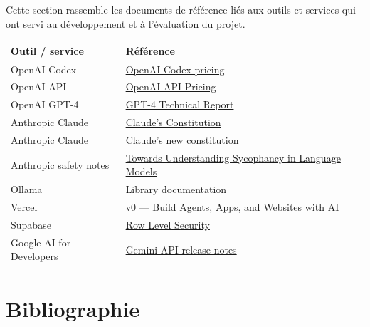 \documentclass[
  10pt,
  a4paper,
  DIV=11,
  numbers=noendperiod,
  oneside]{scrreprt}
\newcounter{none} %
\begin{document}
Cette section rassemble les documents de référence liés aux outils et
services qui ont servi au développement et à l'évaluation du projet.

{\def\LTcaptype{none} %
\begin{longtable}[]{@{}
  >{\raggedright\arraybackslash}p{}
  >{\raggedright\arraybackslash}p{}@{}}
\toprule\noalign{}
\begin{minipage}[b]{\linewidth}\raggedright
Outil / service
\end{minipage} & \begin{minipage}[b]{\linewidth}\raggedright
Référence
\end{minipage} \\
\midrule\noalign{}
\endhead
\bottomrule\noalign{}
\endlastfoot
OpenAI Codex & \href{https://developers.openai.com/codex/pricing}{OpenAI
Codex pricing} \\
OpenAI API & \href{https://openai.com/api/pricing/}{OpenAI API
Pricing} \\
OpenAI GPT-4 & \href{https://openai.com/research/gpt-4}{GPT-4 Technical
Report} \\
Anthropic Claude &
\href{https://www.anthropic.com/news/claudes-constitution}{Claude's
Constitution} \\
Anthropic Claude &
\href{https://www.anthropic.com/news/claudes-new-constitution}{Claude's
new constitution} \\
Anthropic safety notes &
\href{https://www.anthropic.com/news/towards-understanding-sycophancy-in-language-models}{Towards
Understanding Sycophancy in Language Models} \\
Ollama & \href{https://ollama.com/library}{Library documentation} \\
Vercel & \href{https://vercel.com/blog/v0}{v0 --- Build Agents, Apps,
and Websites with AI} \\
Supabase &
\href{https://supabase.com/docs/guides/auth/row-level-security}{Row
Level Security} \\
Google AI for Developers &
\href{https://ai.google.dev/gemini-api/docs/changelog}{Gemini API
release notes} \\
\end{longtable}
}

\chapter*{Bibliographie}\label{bibliography}
\end{document}
